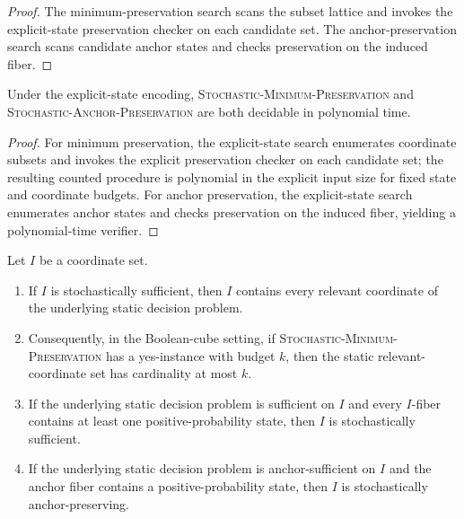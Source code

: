 \begin{proof}
The minimum-preservation search scans the subset lattice and invokes the explicit-state preservation checker on each candidate set. The anchor-preservation search scans candidate anchor states and checks preservation on the induced fiber.
\end{proof}

\begin{theorem}\label{thm:stochastic-preservation-variants-explicit}
Under the explicit-state encoding, \textsc{Stochastic-Minimum-Preservation} and \textsc{Stochastic-Anchor-Preservation} are both decidable in polynomial time.
\end{theorem}


\begin{proof}
For minimum preservation, the explicit-state search enumerates coordinate subsets and invokes the explicit preservation checker on each candidate set; the resulting counted procedure is polynomial in the explicit input size for fixed state and coordinate budgets. For anchor preservation, the explicit-state search enumerates anchor states and checks preservation on the induced fiber, yielding a polynomial-time verifier.
\end{proof}

\begin{proposition}\label{prop:stochastic-preservation-partial-general}
Let $I$ be a coordinate set.
\begin{enumerate}
\item If $I$ is stochastically sufficient, then $I$ contains every relevant coordinate of the underlying static decision problem.
\item Consequently, in the Boolean-cube setting, if \textsc{Stochastic-Minimum-Preservation} has a yes-instance with budget $k$, then the static relevant-coordinate set has cardinality at most $k$.
\item If the underlying static decision problem is sufficient on $I$ and every $I$-fiber contains at least one positive-probability state, then $I$ is stochastically sufficient.
\item If the underlying static decision problem is anchor-sufficient on $I$ and the anchor fiber contains a positive-probability state, then $I$ is stochastically anchor-preserving.
\end{enumerate}
\end{proposition}


